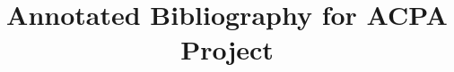 \documentclass[12pt]{article}
\title{Annotated Bibliography for ACPA Project}
\begin{document}
\maketitle
\nocite{*}



\end{document}

